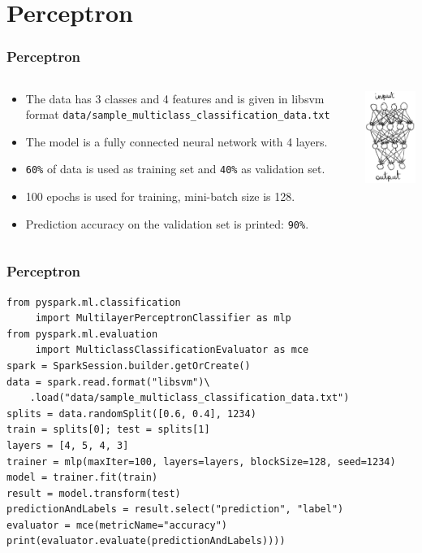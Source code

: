 \documentclass{beamer}
\begin{document}
\section{Perceptron}
\begin{frame}[fragile]
\frametitle{Perceptron}
\begin{columns}
\begin{column}{.75\textwidth}
\begin{itemize}
\item The data has 3 classes and 4 features and is given in libsvm format 
  {\small{\color{mycolorcli}\verb|data/sample_multiclass_classification_data.txt|}}
\item The model is a fully connected neural network with 4 layers.
\item \verb|60%| of data is used as training set and \verb|40%| as validation set.
\item 100 epochs is used for training, mini-batch size is 128.
\item Prediction accuracy on the validation set is printed: \verb|90%|.
\end{itemize}
\end{column}

\begin{column}{.25\textwidth}
\includegraphics[width=3cm]{../../graphs/perceptron.jpg}
\end{column}


\end{columns}

\end{frame}


\begin{frame}[fragile]
\frametitle{Perceptron}
{\small
{\color{mycolorcode}
\begin{verbatim}
from pyspark.ml.classification 
     import MultilayerPerceptronClassifier as mlp
from pyspark.ml.evaluation 
     import MulticlassClassificationEvaluator as mce
spark = SparkSession.builder.getOrCreate()
data = spark.read.format("libsvm")\
    .load("data/sample_multiclass_classification_data.txt")
splits = data.randomSplit([0.6, 0.4], 1234)
train = splits[0]; test = splits[1]
layers = [4, 5, 4, 3]
trainer = mlp(maxIter=100, layers=layers, blockSize=128, seed=1234)
model = trainer.fit(train)
result = model.transform(test)
predictionAndLabels = result.select("prediction", "label")
evaluator = mce(metricName="accuracy")
print(evaluator.evaluate(predictionAndLabels))))
\end{verbatim}
}
}
\end{frame}
\end{document}
